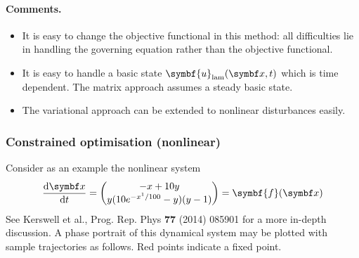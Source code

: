 \documentclass{jknotes}
\renewcommand{\u}{\symbf{u}}
\begin{document}
\paragraph{Comments.}
\begin{itemize}
	\item It is easy to change the objective functional in this method: all
		difficulties lie in handling the governing equation rather than the
		objective functional.
	\item It is easy to handle a basic state $\u_{\text{lam}}(\x,t)$ which is
		time dependent. The matrix approach assumes a steady basic state.
	\item The variational approach can be extended to nonlinear disturbances
		easily.
\end{itemize}

\subsubsection{Constrained optimisation (nonlinear)}
Consider as an example the nonlinear system
\begin{equation}
	\frac{\diffd \x}{\diffd t} = \begin{pmatrix} -x + 10y \\
	y(10e^{-x^1/100}-y)(y-1) \end{pmatrix} = \symbf{f}(\x)
	\label{eq:l14:1}
\end{equation}
See Kerswell et al., Prog. Rep. Phys \textbf{77} (2014) 085901 for a more
in-depth discussion. A phase portrait of this dynamical system may be plotted
with sample trajectories as follows. Red points indicate a fixed point.
\end{document}
